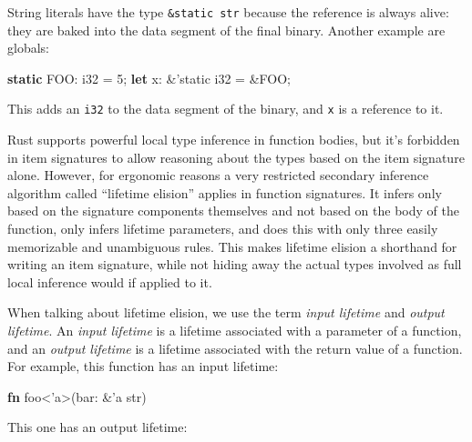 \documentclass[a4paper,]{book}
\newenvironment{Shaded}{\begin{snugshade}}{\end{snugshade}}
\newcommand{\KeywordTok}[1]{\textcolor[rgb]{0.13,0.29,0.53}{\textbf{{#1}}}}
\newcommand{\DataTypeTok}[1]{\textcolor[rgb]{0.13,0.29,0.53}{{#1}}}
\newcommand{\DecValTok}[1]{\textcolor[rgb]{0.00,0.00,0.81}{{#1}}}
\newcommand{\OtherTok}[1]{\textcolor[rgb]{0.56,0.35,0.01}{{#1}}}
\newcommand{\NormalTok}[1]{{#1}}
\begin{document}
String literals have the type \texttt{\&\textquotesingle{}static\ str}
because the reference is always alive: they are baked into the data
segment of the final binary. Another example are globals:

\begin{Shaded}
\begin{Highlighting}[]
\KeywordTok{static} \NormalTok{FOO: }\DataTypeTok{i32} \NormalTok{= }\DecValTok{5}\NormalTok{;}
\KeywordTok{let} \NormalTok{x: &}\OtherTok{'static} \DataTypeTok{i32} \NormalTok{= &FOO;}
\end{Highlighting}
\end{Shaded}

This adds an \texttt{i32} to the data segment of the binary, and
\texttt{x} is a reference to it.


Rust supports powerful local type inference in function bodies, but it's
forbidden in item signatures to allow reasoning about the types based on
the item signature alone. However, for ergonomic reasons a very
restricted secondary inference algorithm called ``lifetime elision''
applies in function signatures. It infers only based on the signature
components themselves and not based on the body of the function, only
infers lifetime parameters, and does this with only three easily
memorizable and unambiguous rules. This makes lifetime elision a
shorthand for writing an item signature, while not hiding away the
actual types involved as full local inference would if applied to it.

When talking about lifetime elision, we use the term \emph{input
lifetime} and \emph{output lifetime}. An \emph{input lifetime} is a
lifetime associated with a parameter of a function, and an \emph{output
lifetime} is a lifetime associated with the return value of a function.
For example, this function has an input lifetime:

\begin{Shaded}
\begin{Highlighting}[]
\KeywordTok{fn} \NormalTok{foo<}\OtherTok{'a}\NormalTok{>(bar: &}\OtherTok{'a} \DataTypeTok{str}\NormalTok{)}
\end{Highlighting}
\end{Shaded}

This one has an output lifetime:
\end{document}

